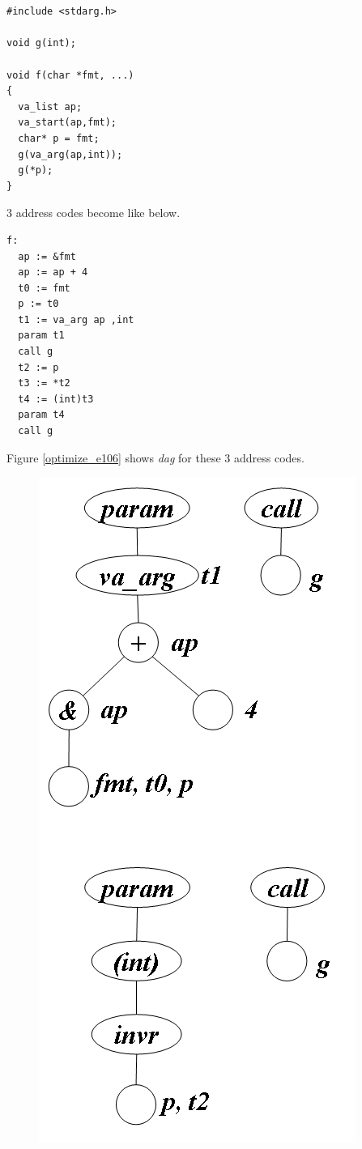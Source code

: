 \begin{Example}
\label{optimize_e105}
\begin{verbatim}


#include <stdarg.h>

void g(int);

void f(char *fmt, ...)
{
  va_list ap;
  va_start(ap,fmt);
  char* p = fmt;
  g(va_arg(ap,int));
  g(*p);
}
\end{verbatim}
3 address codes become like below.
\begin{verbatim}
f:
  ap := &fmt
  ap := ap + 4
  t0 := fmt
  p := t0
  t1 := va_arg ap ,int
  param t1
  call g
  t2 := p
  t3 := *t2
  t4 := (int)t3
  param t4
  call g
\end{verbatim}
Figure \ref{optimize_e106} shows {\em dag} for these 3 address codes.
\begin{figure}[htbp]
\begin{center}
\begin{htmlonly}
\includegraphics[width=0.546\linewidth,height=1.2\linewidth]{opt046.png}
\end{htmlonly}
\begin{latexonly}

\end{latexonly}
\end{center}
\end{figure}
\end{Example}
